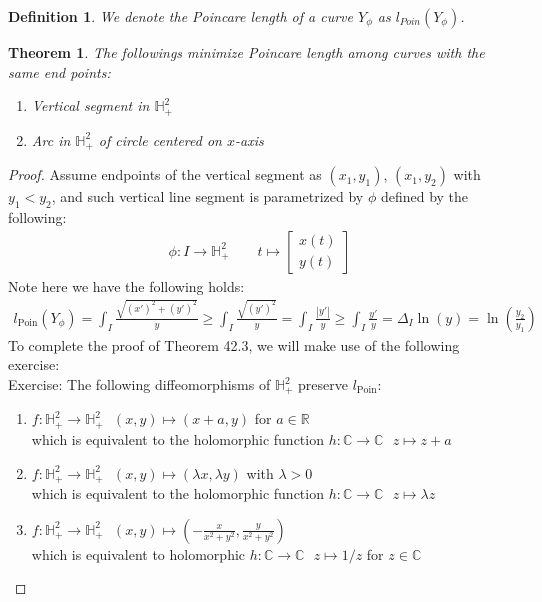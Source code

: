 \documentclass[11pt,oneside]{book}
\theoremstyle{break}
\theoremstyle{break}
\newtheorem{thm}{Theorem}[section]
\newtheorem{defn}{Definition}[corL]
\newcommand{\R}{\mathbb{R}}
\newcommand{\Complex}{\mathbb{C}}
\newcommand{\bmat}[1]{\begin{bmatrix} #1 \end{bmatrix}}
\newcommand{\exercise}{\color{green}Exercise: \color{black}}
\begin{document}
\begin{defn}
We denote the Poincare length of a curve $Y_{\phi}$ as $l_{Poin}(Y_\phi)$.
\end{defn}

\begin{thm}
The followings minimize Poincare length among curves with the same end points:
\begin{enumerate}[topsep=3pt,itemsep=-1ex,partopsep=1ex,parsep=1ex]
\item Vertical segment in $\mathbb{H}_+^2$
\item Arc in $\mathbb{H}_+^2$ of circle centered on $x$-axis
\end{enumerate}
\end{thm}
\begin{proof}
Assume endpoints of the vertical segment as $(x_1, y_1)$, $(x_1,y_2)$ with $y_1 < y_2$, and such vertical line segment is parametrized by $\phi$ defined by the following:
\begin{align*}
\phi : I \to \mathbb{H}_+^2 \qquad t\mapsto \bmat{x(t) \\ y(t)}
\end{align*}
Note here we have the following holds:
\begin{align*}
l_{\text{Poin}}\left(Y_{\phi}\right) = \int_I \frac{\sqrt{(x')^2 + (y')^2}}{y} \geq \int_I \frac{\sqrt{(y')^2}}{y} =\int_I \frac{|y'|}{y} \geq \int_I \frac {y'}{y} = \Delta_I \ln(y) = \ln\left( \frac{y_2}{y_1}\right)
\end{align*}
To complete the proof of Theorem 42.3, we will make use of the following exercise:\\

\exercise The following diffeomorphisms of $\mathbb{H}_+^2$ preserve $l_{\text{Poin}}$:
\begin{enumerate}[topsep=3pt,itemsep=-1ex,partopsep=1ex,parsep=1ex]
\item $f: \mathbb{H}_+^2 \to \mathbb{H}_+^2 \ \ \ (x,y) \mapsto (x+a, y)$ for $a \in \R$\\
which is equivalent to the holomorphic function $h:\Complex \to \Complex \ \ \ z\mapsto z+a$
\item $f: \mathbb{H}_+^2 \to \mathbb{H}_+^2\ \ \ (x,y) \mapsto (\lambda x, \lambda y)$ with $\lambda>0$\\
which is equivalent to the holomorphic function $h:\Complex \to \Complex \ \ \ z\mapsto \lambda z$
\item $f: \mathbb{H}_+^2 \to \mathbb{H}_+^2\ \ \ (x,y) \mapsto (-\frac{x}{x^2+y^2} , \frac{y}{x^2 + y^2})$\\
which is equivalent to holomorphic $h: \Complex  \to \Complex  \ \ \ z\mapsto 1/z$ for $z \in \Complex$
\end{enumerate}


\end{proof}
\end{document}
